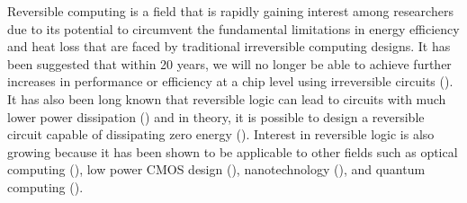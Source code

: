 Reversible computing is a field that is rapidly gaining interest among researchers due to its potential to circumvent the fundamental limitations in energy efficiency and heat loss that are faced by traditional irreversible computing designs. It has been suggested that within 20 years, we will no longer be able to achieve further increases in performance or efficiency at a chip level using irreversible circuits (\cite{Frank2005}). It has also been long known that reversible logic can lead to circuits with much lower power dissipation (\cite{Landauer61}) and in theory, it is possible to design a reversible circuit capable of dissipating zero energy (\cite{Bennett73}). Interest in reversible logic is also growing because it has been shown to be applicable to other fields such as optical computing (\cite{Picton91}), low power CMOS design (\cite{Athas94}), nanotechnology (\cite{Merkle1993}), and quantum computing (\cite{AlRabadi2004}).